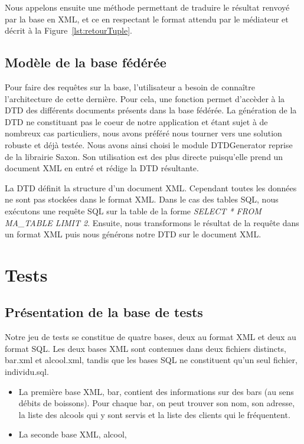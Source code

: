\documentclass[a4paper,10pt]{article}
\newcommand{\fref}[1]{Figure~\ref{#1}}
\begin{document}
Nous appelons ensuite une méthode permettant de traduire le résultat renvoyé par la base en XML, et ce en respectant le format attendu par le médiateur et décrit à la \fref{lst:retourTuple}.

\subsection{Modèle de la base fédérée}

Pour faire des requêtes sur la base, l'utilisateur a besoin de connaître l'architecture de cette dernière. 
Pour cela, une fonction permet d'accèder à la DTD des différents documents présents dans la base fédérée.
La génération de la DTD ne constituant pas le coeur de notre application et étant sujet à de nombreux cas particuliers, nous avons préféré nous tourner vers une solution robuste et déjà testée.
Nous avons ainsi choisi le module DTDGenerator reprise de la librairie Saxon. 
Son utilisation est des plus directe puisqu'elle prend un document XML en entré et rédige la DTD résultante.

La DTD définit la structure d'un document XML.
Cependant toutes les données ne sont pas stockées dans le format XML.
Dans le cas des tables SQL, nous exécutons une requête SQL sur la table de la forme \emph{SELECT * FROM MA_TABLE LIMIT 2}.
Ensuite, nous transformons le résultat de la requête dans un format XML puis nous générons notre DTD sur le document XML.


\newpage
\section{Tests}

\subsection{Présentation de la base de tests}

Notre jeu de tests se constitue de quatre bases, deux au format XML et deux au format SQL. Les deux bases XML sont contenues dans deux fichiers distincts, bar.xml et alcool.xml, tandis que les bases SQL ne constituent qu'un seul fichier, individu.sql.

\begin{itemize}
\item La première base XML, bar, contient des informations sur des bars (au sens débits de boissons). Pour chaque bar, on peut trouver son nom, son adresse, la liste des alcools qui y sont servis et la liste des clients qui le fréquentent.
\item La seconde base XML, alcool, 
\end{itemize}
\end{document}
